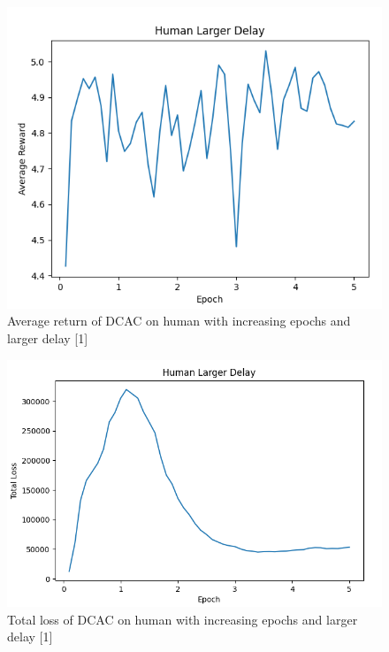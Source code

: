 \documentclass{article} %
\begin{document}
\begin{figure}[H]
\begin{center}
\includegraphics[scale=0.3]{images/delay_human_reward.png}
\end{center}
\caption{Average return of DCAC on human with increasing epochs and larger delay [1]}
\label{averageReturnDelay}
\end{figure}

\begin{figure}[H]
\begin{center}
\includegraphics[scale=0.3]{images/delay_human_loss.png}
\end{center}
\caption{Total loss of DCAC on human with increasing epochs and larger delay [1]}
\label{totalLossDelay}
\end{figure}
\end{document}

